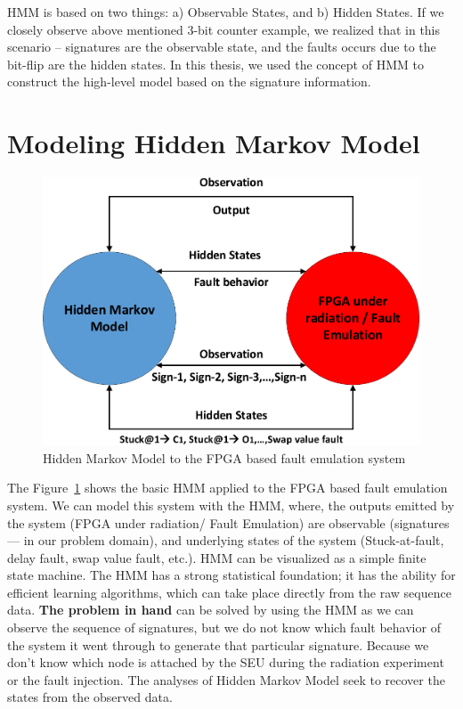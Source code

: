 HMM is based on  two things: a) Observable States, and b) Hidden States. If we closely observe above mentioned 3-bit counter example, we realized that in this scenario --  signatures are the observable state, and the faults occurs due to the bit-flip are the hidden states. In this thesis, we used the concept of HMM to construct the high-level model based on the signature information.

\section{Modeling Hidden Markov Model}
\begin{figure}[tb!]
 \centering
  \captionsetup{justification=centering}    
   \includegraphics[scale=0.8]{Figures/HMM-air.pdf}
   \caption{Hidden Markov Model to the FPGA based fault emulation system}
\label{fig:HMM-air}
\end{figure}
The Figure~\ref{fig:HMM-air} shows the basic HMM applied to the FPGA based fault emulation system. We can model this system with the HMM, where, the outputs emitted by the system (FPGA under radiation/ Fault Emulation) are observable (signatures --- in our problem domain), and underlying states of the system (Stuck-at-fault, delay fault, swap value fault, etc.). HMM can be visualized as a simple finite state machine. The HMM has a strong statistical foundation; it has the ability for efficient learning algorithms, which can take place directly from the raw sequence data. \textbf{The problem in hand} can be solved by using the HMM as we can observe the sequence of signatures, but we do not know  which fault behavior  of the system it went through to generate that particular signature. Because we don't know which node is attached by the SEU during the radiation experiment or the fault injection. The analyses of Hidden Markov Model seek to recover the states from the observed data.


